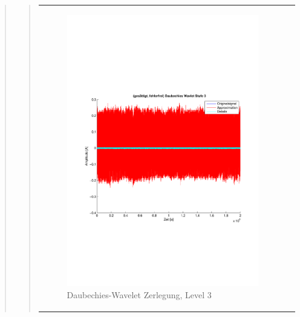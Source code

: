 \begin{quote}
\begin{quote}
\begin{center}
\begin{tabular}{ll}
\begin{minipage}{0.6\textwidth}
                    \end{minipage}
                    \begin{minipage}{0.6\textwidth}
    
                        \begin{figure}[H]
                            \label{fig:}
                            \includegraphics[scale=0.4, trim = 2cm 6cm 1cm
                            7.5cm,
                            clip]{./Bilder/Termin8/fehlerfrei_gesaettigt_Daubechies_Wavlet_lvl_3}
                            \caption{Daubechies-Wavelet Zerlegung, Level 3}
                        \end{figure}
                    \vspace{-1.5em}
    
                    \end{minipage}
    

\end{tabular}
\end{center}
\end{quote}
\end{quote}
